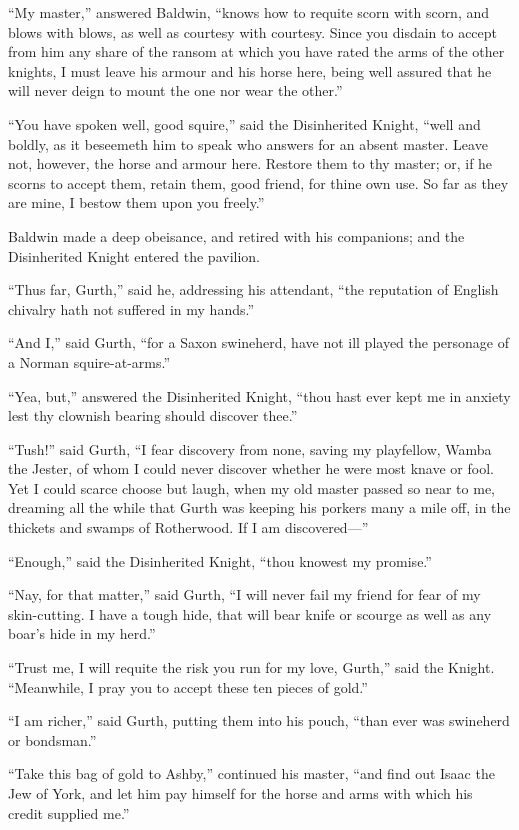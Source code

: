 ``My master,'' answered Baldwin, ``knows how to requite scorn with
scorn, and blows with blows, as well as courtesy with courtesy. Since
you disdain to accept from him any share of the ransom at which you have
rated the arms of the other knights, I must leave his armour and his
horse here, being well assured that he will never deign to mount the one
nor wear the other.''

``You have spoken well, good squire,'' said the Disinherited Knight,
``well and boldly, as it beseemeth him to speak who answers for an
absent master. Leave not, however, the horse and armour here. Restore
them to thy master; or, if he scorns to accept them, retain them, good
friend, for thine own use. So far as they are mine, I bestow them upon
you freely.''

Baldwin made a deep obeisance, and retired with his companions; and the
Disinherited Knight entered the pavilion.

``Thus far, Gurth,'' said he, addressing his attendant, ``the reputation
of English chivalry hath not suffered in my hands.''

``And I,'' said Gurth, ``for a Saxon swineherd, have not ill played the
personage of a Norman squire-at-arms.''

``Yea, but,'' answered the Disinherited Knight, ``thou hast ever kept me
in anxiety lest thy clownish bearing should discover thee.''

``Tush!'' said Gurth, ``I fear discovery from none, saving my
playfellow, Wamba the Jester, of whom I could never discover whether he
were most knave or fool. Yet I could scarce choose but laugh, when my
old master passed so near to me, dreaming all the while that Gurth was
keeping his porkers many a mile off, in the thickets and swamps of
Rotherwood. If I am discovered---''

``Enough,'' said the Disinherited Knight, ``thou knowest my promise.''

``Nay, for that matter,'' said Gurth, ``I will never fail my friend for
fear of my skin-cutting. I have a tough hide, that will bear knife or
scourge as well as any boar's hide in my herd.''

``Trust me, I will requite the risk you run for my love, Gurth,'' said
the Knight. ``Meanwhile, I pray you to accept these ten pieces of
gold.''

``I am richer,'' said Gurth, putting them into his pouch, ``than ever
was swineherd or bondsman.''

``Take this bag of gold to Ashby,'' continued his master, ``and find out
Isaac the Jew of York, and let him pay himself for the horse and arms
with which his credit supplied me.''

